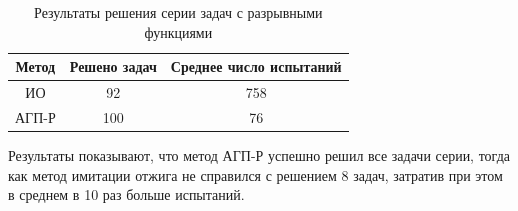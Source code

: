 \documentclass[11pt, oneside, a4paper]{article}
\begin{document}
\begin{table}[h]
	\caption{Результаты решения серии задач с разрывными функциями}
	\begin{center}
		\begin{tabular}{|c|c|c|}
			\hline
			Метод & Решено задач & Среднее число испытаний \\
			\hline
			\hline
			ИО    &  92 &   758  \\
			\hline
			АГП-Р & 100  & 76 \\
			\hline
		\end{tabular}
	\end{center}
\end{table}

Результаты показывают, что метод АГП-Р успешно решил все задачи серии, тогда как метод имитации отжига не справился с решением 8 задач, затратив при этом в среднем в 10 раз больше испытаний.
\end{document}
